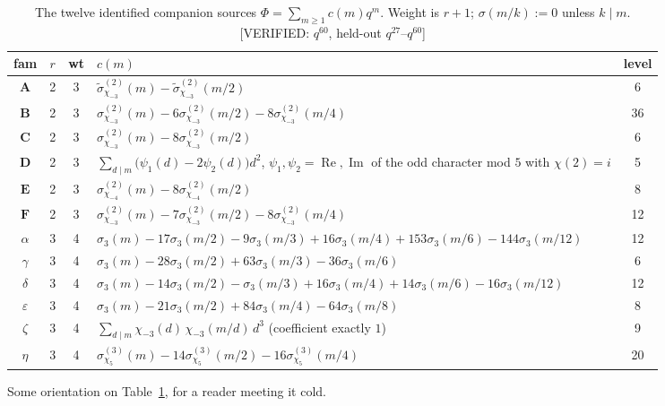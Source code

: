 \documentclass[11pt,reqno]{amsart}
\theoremstyle{plain}
\theoremstyle{definition}
\theoremstyle{remark}
\newcommand{\chim}[1]{\chi_{-#1}}
\newcommand{\VerifiedR}[1]{\textup{\textsf{[VERIFIED: #1]}}}
\begin{document}
\begin{table}[t]
\caption{The twelve identified companion sources
$\Phi=\sum_{m\ge1}c(m)q^m$. Weight is $r+1$; $\sigma(m/k):=0$ unless
$k\mid m$. \VerifiedR{$q^{60}$, held-out $q^{27}$--$q^{60}$}}
\label{tab:main}
\renewcommand{\arraystretch}{1.25}
\begin{tabular}{@{}c c c >{\raggedright\arraybackslash}p{7.6cm} c@{}}
\toprule
fam & $r$ & wt & $c(m)$ & level\\
\midrule
$\mathbf A$ & 2 & 3 &
$\widetilde\sigma_{\chim3}^{(2)}(m)-\widetilde\sigma_{\chim3}^{(2)}(m/2)$ & 6\\
$\mathbf B$ & 2 & 3 &
$\sigma_{\chim3}^{(2)}(m)-6\sigma_{\chim3}^{(2)}(m/2)
-8\sigma_{\chim3}^{(2)}(m/4)$ & 36\\
$\mathbf C$ & 2 & 3 &
$\sigma_{\chim3}^{(2)}(m)-8\sigma_{\chim3}^{(2)}(m/2)$ & 6\\
$\mathbf D$ & 2 & 3 &
$\sum_{d\mid m}\bigl(\psi_1(d)-2\psi_2(d)\bigr)d^2$,\quad
$\psi_1,\psi_2=\operatorname{Re},\operatorname{Im}$ of the odd character
mod $5$ with $\chi(2)=i$ & 5\\
$\mathbf E$ & 2 & 3 &
$\sigma_{\chim4}^{(2)}(m)-8\sigma_{\chim4}^{(2)}(m/2)$ & 8\\
$\mathbf F$ & 2 & 3 &
$\sigma_{\chim3}^{(2)}(m)-7\sigma_{\chim3}^{(2)}(m/2)
-8\sigma_{\chim3}^{(2)}(m/4)$ & 12\\[2pt]
$\alpha$ & 3 & 4 &
$\sigma_3(m)-17\sigma_3(m/2)-9\sigma_3(m/3)+16\sigma_3(m/4)
+153\sigma_3(m/6)-144\sigma_3(m/12)$ & 12\\
$\gamma$ & 3 & 4 &
$\sigma_3(m)-28\sigma_3(m/2)+63\sigma_3(m/3)-36\sigma_3(m/6)$ & 6\\
$\delta$ & 3 & 4 &
$\sigma_3(m)-14\sigma_3(m/2)-\sigma_3(m/3)+16\sigma_3(m/4)
+14\sigma_3(m/6)-16\sigma_3(m/12)$ & 12\\
$\varepsilon$ & 3 & 4 &
$\sigma_3(m)-21\sigma_3(m/2)+84\sigma_3(m/4)-64\sigma_3(m/8)$ & 8\\
$\zeta$ & 3 & 4 &
$\displaystyle\sum_{d\mid m}\chim3(d)\,\chim3(m/d)\,d^3$
\quad(coefficient exactly $1$) & 9\\
$\eta$ & 3 & 4 &
$\sigma_{\chi_5}^{(3)}(m)-14\sigma_{\chi_5}^{(3)}(m/2)
-16\sigma_{\chi_5}^{(3)}(m/4)$ & 20\\
\bottomrule
\end{tabular}
\end{table}

Some orientation on Table~\ref{tab:main}, for a reader meeting it cold.
\end{document}
